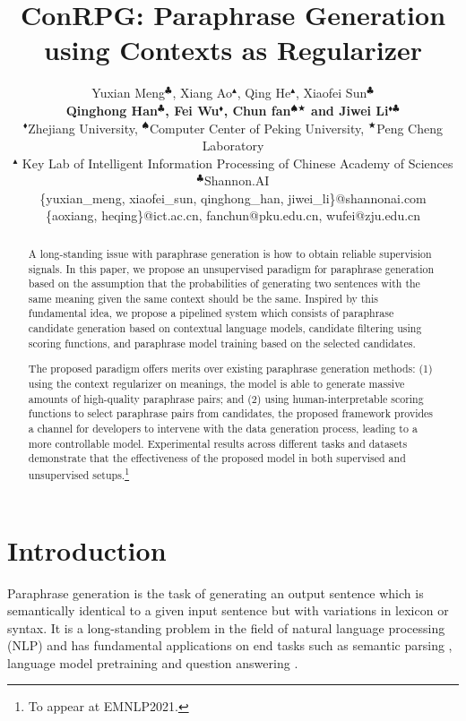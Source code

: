 \documentclass[11pt,a4paper]{article}
\title{ConRPG: Paraphrase Generation using Contexts as Regularizer}
\date{}
\author{Yuxian Meng$^\clubsuit$, Xiang Ao$^\blacktriangle$, Qing He$^\blacktriangle$, Xiaofei Sun$^\clubsuit$\\
{\bf Qinghong Han$^\clubsuit$, Fei Wu$^\blacklozenge$, Chun fan$^{\spadesuit\bigstar}$ and Jiwei Li$^{\blacklozenge\clubsuit}$}\\
  $^\blacklozenge$Zhejiang University,
  $^\spadesuit$Computer Center of Peking University,
  $^\bigstar$Peng Cheng Laboratory\\
  $^\blacktriangle$ Key Lab of Intelligent Information Processing of Chinese Academy of Sciences  \\
  $^\clubsuit$Shannon.AI\\
  \{yuxian\_meng,  xiaofei\_sun, qinghong\_han, jiwei\_li\}@shannonai.com\\
  \{aoxiang, heqing\}@ict.ac.cn,
  fanchun@pku.edu.cn,
  wufei@zju.edu.cn
}
\begin{document}
\maketitle

\begin{abstract}
A long-standing issue with paraphrase generation is 
how to obtain
 reliable supervision signals. In this paper, we propose an unsupervised paradigm for paraphrase generation based on the assumption that the probabilities of generating two sentences with the same meaning given the same context should be the same. Inspired by this fundamental idea, we propose a pipelined system which consists of paraphrase candidate generation based on contextual language models, candidate filtering using scoring functions, and paraphrase model training based on  the selected candidates. 

The proposed paradigm offers merits over existing paraphrase generation methods: (1) using the context regularizer on meanings, the model is able to generate massive amounts of high-quality paraphrase pairs; and (2) using human-interpretable scoring functions to select paraphrase pairs from candidates, the proposed framework provides a channel for developers to intervene with the data generation process, leading to a more controllable model. Experimental results across different tasks and datasets demonstrate that the effectiveness of the proposed model  in both supervised and unsupervised setups.\footnote{To appear at EMNLP2021.}

\end{abstract}




\section{Introduction}
Paraphrase generation
\cite{prakash2016neural,cao2016joint,ma-etal-2018-query,wang2018task}
 is the task of generating an output sentence which is semantically identical to a given input sentence but with variations in lexicon or syntax. It is a long-standing problem in the field of natural language processing (NLP) \citep{mckeown-1979-paraphrasing,meteer1988strategies,quirk-etal-2004-monolingual,bannard-callison-burch-2005-paraphrasing,chen2011collecting} and has fundamental applications on end tasks such as semantic parsing \citep{berant2014semantic}, language model pretraining \citep{lewis2020pre} and question answering \citep{dong2017learning}.
\end{document}

